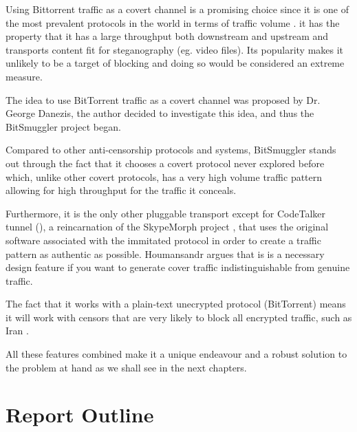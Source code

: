 \documentclass[11pt]{book} %
\newcommand{\projectName}{BitSmuggler }
\begin{document}
Using Bittorrent traffic as a covert channel is a promising choice since it is one of the most prevalent protocols in the world in terms of traffic volume \citep*{web.sandvineInternet}. it has the property that it has a large throughput both downstream and upstream and transports content fit for steganography (eg. video files). Its popularity makes it unlikely to be a target of blocking and doing so would be considered an extreme measure.

The idea to use BitTorrent traffic as a covert channel was proposed by Dr. George Danezis, the author decided to investigate this idea, and thus the \projectName project began.

Compared to other anti-censorship protocols and systems, \projectName stands out through the fact that it chooses a covert protocol never explored before which, unlike other covert protocols, has a very high volume traffic pattern allowing for high throughput for the traffic it conceals.

Furthermore, it is the only other pluggable transport except for CodeTalker tunnel (\citep*{web:codeTalker}), a reincarnation of the SkypeMorph project \citep*{skypeMorph}, that uses the original software associated with the immitated protocol in order to create a traffic pattern as authentic as possible. Houmansandr \citep*{deadParrot} argues that is is a necessary design feature if you want to generate cover traffic indistinguishable from genuine traffic.

The fact that it works with a plain-text unecrypted protocol (BitTorrent) means it will work with censors that are very likely to block all encrypted traffic, such as Iran \citep*{web:iranBlocksEncryptedTraffic}.

All these features combined make it a unique endeavour and a robust solution to the problem at hand as we shall see in the next chapters.

\section{Report Outline}
\end{document}

